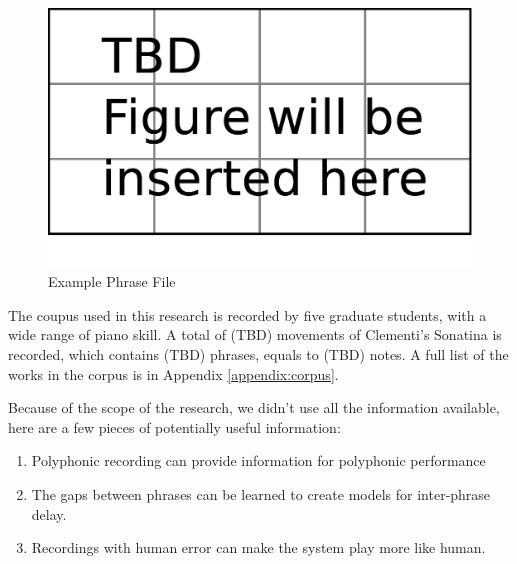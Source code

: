 
\begin{figure}[tp]
   \begin{center}
      \includegraphics[width=\textwidth]{fig/TBDFigure}

   \end{center}
   \caption{Example Phrase File}
   \label{fig:phrase}
\end{figure}


The coupus used in this research is recorded by five graduate students, with a wide range of piano skill. A total of (TBD) movements of Clementi's Sonatina is recorded, which contains (TBD) phrases, equals to (TBD) notes. A full list of the works in the corpus is in Appendix \ref{appendix:corpus}.

Because of the scope of the research, we didn't use all the information available, here are a few pieces of potentially useful information:
\begin{enumerate}
   \item Polyphonic recording can provide information for polyphonic performance
   \item The gaps between phrases can be learned to create models for inter-phrase delay.
   \item Recordings with human error can make the system play more like human.
\end{enumerate}
